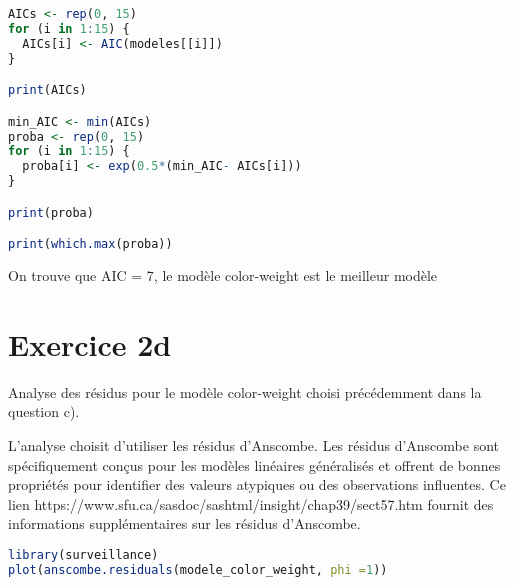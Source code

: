 \documentclass[../main.tex]{subfiles}
\begin{document}
\begin{CJK*}{UTF8}{gbsn}
\begin {lstlisting}[language=R]
AICs <- rep(0, 15)
for (i in 1:15) {
  AICs[i] <- AIC(modeles[[i]])
}

print(AICs)

min_AIC <- min(AICs)
proba <- rep(0, 15)
for (i in 1:15) {
  proba[i] <- exp(0.5*(min_AIC- AICs[i]))
}

print(proba)

print(which.max(proba))

\end{lstlisting}
 On trouve que AIC = 7, le modèle color-weight est le meilleur modèle

\section*{Exercice 2d}

 Analyse des résidus pour le modèle color-weight choisi précédemment dans la question c).

  L'analyse choisit d'utiliser les résidus d'Anscombe. Les résidus d'Anscombe sont spécifiquement conçus pour les modèles linéaires généralisés et offrent de bonnes propriétés pour identifier des valeurs atypiques ou des observations influentes. Ce lien https://www.sfu.ca/sasdoc/sashtml/insight/chap39/sect57.htm fournit des informations supplémentaires sur les résidus d'Anscombe.

  \begin {lstlisting}[language=R]
  library(surveillance)
plot(anscombe.residuals(modele_color_weight, phi =1))
  \end{lstlisting}

\end{CJK*}
\end{document}
